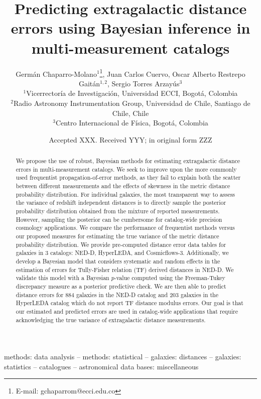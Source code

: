 \documentclass[a4paper,fleqn,usenatbib]{mnras}
\title[Predicting extragalactic distance errors]{Predicting extragalactic distance errors using Bayesian inference in multi-measurement catalogs}
\author[G. Chaparro-Molano et al.]{Germ\'an Chaparro-Molano$^{1}$\thanks{E-mail: gchaparrom@ecci.edu.co},
Juan Carlos Cuervo,
Oscar Alberto Restrepo Gait\'an$^{1,2}$, \newauthor
Sergio Torres Arzay\'{u}s$^{3}$
\\
$^{1}$Vicerrector\'ia de Investigaci\'on, Universidad ECCI, Bogot\'a, Colombia\\
$^{2}$Radio Astronomy Instrumentation Group, Universidad de Chile, Santiago de Chile, Chile\\
$^{3}$Centro Internacional de F\'isica, Bogot\'a, Colombia
}
\date{Accepted XXX. Received YYY; in original form ZZZ}
\begin{document}
\label{firstpage}
\pagerange{\pageref{firstpage}--\pageref{lastpage}}
\maketitle

\begin{abstract}
We propose the use of robust, Bayesian methods for estimating extragalactic distance errors in multi-measurement catalogs. We seek to improve upon the more commonly used frequentist propagation-of-error methods, as they fail to explain both the scatter between different measurements and the effects of skewness in the metric distance probability distribution. For individual galaxies, the most transparent way to assess the variance of redshift independent distances is to directly sample the posterior probability distribution obtained from the mixture of reported measurements. However, sampling the posterior can be cumbersome for catalog-wide precision cosmology applications. We compare the performance of frequentist methods versus our proposed measures for estimating the true variance of the metric distance probability distribution. We provide pre-computed distance error data tables for galaxies in 3 catalogs: NED-D, HyperLEDA, and Cosmicflows-3. Additionally, we develop a Bayesian model that considers systematic and random effects in the estimation of errors for Tully-Fisher relation (TF) derived distances in NED-D. We validate this model with a Bayesian $p$-value computed using the Freeman-Tukey discrepancy measure as a posterior predictive check. We are then able to predict distance errors for 884 galaxies in the NED-D catalog and 203 galaxies in the HyperLEDA catalog which do not report TF distance modulus errors. Our goal is that our estimated and predicted errors are used in catalog-wide applications that require acknowledging the true variance of extragalactic distance measurements.
\end{abstract}

\begin{keywords}
methods: data analysis -- methods: statistical -- galaxies: distances -- galaxies: statistics -- catalogues -- astronomical data bases: miscellaneous
\end{keywords}


\end{document}
